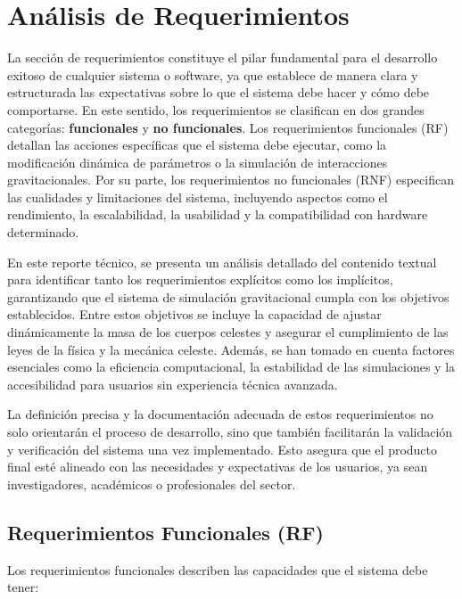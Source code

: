 \section{Análisis de Requerimientos}

La sección de requerimientos constituye el pilar fundamental para el desarrollo exitoso de cualquier sistema o software, ya que establece de manera clara y estructurada las expectativas sobre lo que el sistema debe hacer y cómo debe comportarse. En este sentido, los requerimientos se clasifican en dos grandes categorías: \textbf{funcionales} y \textbf{no funcionales}. Los requerimientos funcionales (RF) detallan las acciones específicas que el sistema debe ejecutar, como la modificación dinámica de parámetros o la simulación de interacciones gravitacionales. Por su parte, los requerimientos no funcionales (RNF) especifican las cualidades y limitaciones del sistema, incluyendo aspectos como el rendimiento, la escalabilidad, la usabilidad y la compatibilidad con hardware determinado.

En este reporte técnico, se presenta un análisis detallado del contenido textual para identificar tanto los requerimientos explícitos como los implícitos, garantizando que el sistema de simulación gravitacional cumpla con los objetivos establecidos. Entre estos objetivos se incluye la capacidad de ajustar dinámicamente la masa de los cuerpos celestes y asegurar el cumplimiento de las leyes de la física y la mecánica celeste. Además, se han tomado en cuenta factores esenciales como la eficiencia computacional, la estabilidad de las simulaciones y la accesibilidad para usuarios sin experiencia técnica avanzada.

La definición precisa y la documentación adecuada de estos requerimientos no solo orientarán el proceso de desarrollo, sino que también facilitarán la validación y verificación del sistema una vez implementado. Esto asegura que el producto final esté alineado con las necesidades y expectativas de los usuarios, ya sean investigadores, académicos o profesionales del sector.

\subsection{Requerimientos Funcionales (RF)}

Los requerimientos funcionales describen las capacidades que el sistema debe tener:

